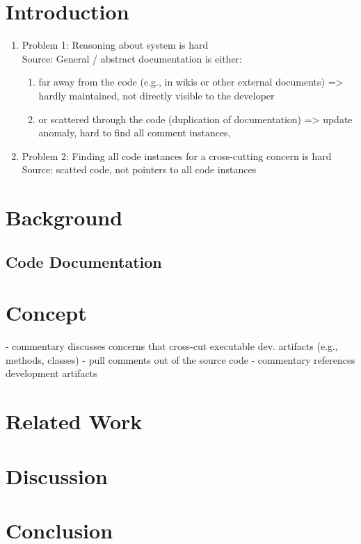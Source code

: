 \section{Introduction}
\begin{enumerate}
	
\item  Problem 1: Reasoning about system is hard\\
Source: General / abstract documentation is either:
\begin{enumerate}
	\item far away from the code (e.g., in wikis or other external documents) => hardly maintained, not directly visible to the developer
	\item or scattered through the code (duplication of documentation) => update anomaly, hard to find all comment instances, 
\end{enumerate}

\item  Problem 2: Finding all code instances for a cross-cutting concern is hard\\
Source: scatted code, not pointers to all code instances

\end{enumerate}
\section{Background}

\subsection{Code Documentation}

\section{Concept}
- commentary discusses concerns that cross-cut executable dev. artifacts (e.g., methods, classes)
- pull comments out of the source code 
- commentary references development artifacts 
\section{Related Work}

\section{Discussion}

\section{Conclusion}

